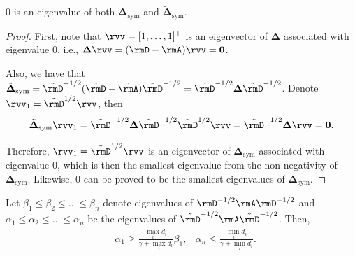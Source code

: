 \begin{lemma}
\label{lem:0_eig}
$0$ is an eigenvalue of both $\boldsymbol{\Delta}_{\text{sym}}$ and $\tilde{\boldsymbol{\Delta}}_{\text{sym}}$.
\end{lemma}
\begin{proof}
First, note that $\rvv=[1,\ldots,1]^\top$ is an eigenvector of $\boldsymbol{\Delta}$ associated with eigenvalue $0$, i.e., $\boldsymbol{\Delta} \rvv = (\rmD-\rmA)\rvv = \mathbf{0}$.

Also, we have that $\tilde{\boldsymbol{\Delta}}_{\text{sym}} = \tilde{\rmD}^{-1/2}(\tilde{\rmD} - \tilde{\rmA})\tilde{\rmD}^{-1/2} = \tilde{\rmD}^{-1/2}\boldsymbol{\Delta}\tilde{\rmD}^{-1/2}$. Denote $\rvv_1=\tilde{\rmD}^{1/2}\rvv$, then
$$
\tilde{\boldsymbol{\Delta}}_{\text{sym}}\rvv_1 = \tilde{\rmD}^{-1/2}\boldsymbol{\Delta}\tilde{\rmD}^{-1/2}\tilde{\rmD}^{1/2}\rvv = \tilde{\rmD}^{-1/2} \boldsymbol{\Delta} \rvv = \mathbf{0}.
$$

Therefore, $\rvv_1=\tilde{\rmD}^{1/2}\rvv$ is an eigenvector of $\tilde{\boldsymbol{\Delta}}_{\text{sym}}$ associated with eigenvalue $0$, which is then the smallest eigenvalue from the non-negativity of $\tilde{\boldsymbol{\Delta}}_{\text{sym}}$. Likewise, 0 can be proved to be the smallest eigenvalues of $\boldsymbol{\Delta}_{\text{sym}}$.
\end{proof}

\begin{lemma}
\label{lem:adj_eig}
Let $\beta_1 \leq \beta_2 \leq \dots \leq \beta_n$ denote eigenvalues of $\rmD^{-1/2}\rmA \rmD^{-1/2}$ and $\alpha_1 \leq \alpha_2 \leq \dots \leq \alpha_n$ be the eigenvalues of $\tilde{\rmD}^{-1/2}\rmA\tilde{\rmD}^{-1/2}$. Then,
\begin{align} \label{eq:bounds_norm_adj}
    & \alpha_1 \geq \frac{\max_i d_i}{\gamma+\max_i d_i}\beta_1, &\alpha_n \leq \frac{\min_i{d_i}}{\gamma + \min_i{d_i}}.
\end{align}
\end{lemma}

